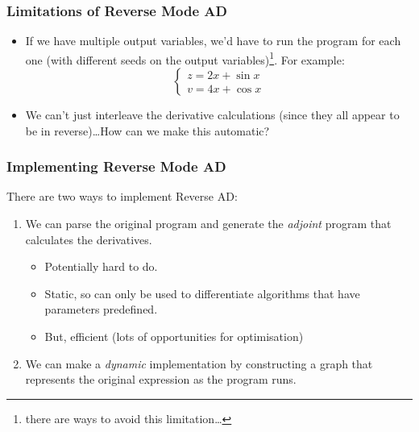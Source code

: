 \documentclass[]{article}
\begin{document}
\begin{frame}
\frametitle{Limitations of Reverse Mode AD}

\begin{itemize}
	\item If we have multiple output variables, we'd have to run the program for each one (with different seeds on the output variables)\footnote{there are ways to avoid this limitation\ldots}. For example:
\[
   \begin{cases}
     z = 2x + \sin x\\
     v = 4x + \cos x
   \end{cases}
\]
	\item We can't just interleave the derivative calculations (since they all appear to be in reverse)\ldots How can we make this automatic?
\end{itemize}
\end{frame}

\begin{frame}
\frametitle{Implementing Reverse Mode AD}

There are two ways to implement Reverse AD:

\begin{enumerate}
	\item We can parse the original program and generate the \emph{adjoint} program that calculates the derivatives.
	\begin{itemize}
		\item Potentially hard to do.
		\item Static, so can only be used to differentiate algorithms that have parameters predefined.
		\item But, efficient (lots of opportunities for optimisation)
	\end{itemize}
	\item We can make a \emph{dynamic} implementation by constructing a graph that represents the original expression as the program runs.
\end{enumerate}
\end{frame}
\end{document}
